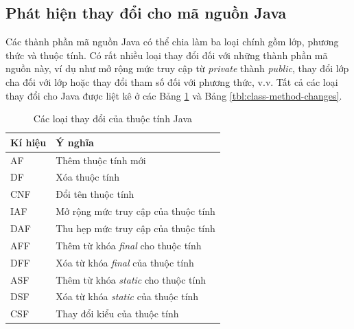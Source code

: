 \documentclass[12pt]{report}
\begin{document}
\subsection{Phát hiện thay đổi cho mã nguồn Java}
Các thành phần mã nguồn Java có thể chia làm ba loại chính gồm lớp, phương thức và thuộc tính. Có rất nhiều loại thay đổi đối với những thành phần mã nguồn này, ví dụ như mở rộng mức truy cập từ \textit{private} thành \textit{public}, thay đổi lớp cha đối với lớp hoặc thay đổi tham số đối với phương thức, v.v. Tất cả các loại thay đổi cho Java được liệt kê ở các Bảng \ref{tbl:field-ct} và Bảng \ref{tbl:class-method-changes}.


\begin{table}[h]
	\centering
	\caption{Các loại thay đổi của thuộc tính Java}
	\label{tbl:field-ct}
	\begin{tabular}{|l|l|}
		\hline
		\textbf{Kí hiệu} & \textbf{Ý nghĩa}                                        \\ \hline
		AF               & Thêm thuộc tính mới                                            \\ \hline
		DF               & Xóa thuộc tính                                                 \\
		\hline
		CNF               & Đổi tên thuộc tính                                                 \\
		\hline
		IAF              & Mở rộng mức truy cập của thuộc tính                            \\ \hline
		DAF              & Thu hẹp mức truy cập của thuộc tính                            \\ \hline
		AFF              & Thêm từ khóa \textit{final} cho thuộc tính    \\ \hline
		DFF              & Xóa từ khóa \textit{final} của thuộc tính     \\ \hline
		ASF              & Thêm từ khóa \textit{static} cho thuộc tính   \\ \hline
		DSF              & Xóa từ khóa \textit{static} của thuộc tính    \\ \hline
		CSF              & Thay đổi kiểu của thuộc tính    \\ \hline
	\end{tabular}
\end{table}
\end{document}
